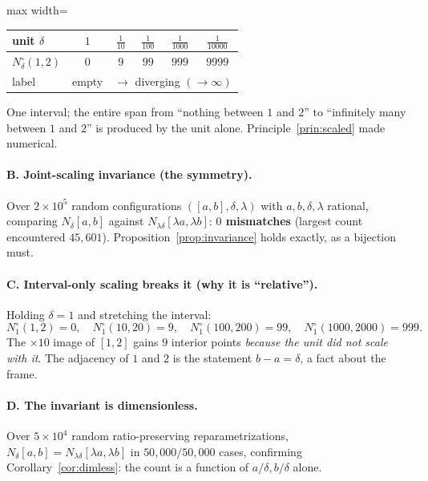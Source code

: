 \documentclass[11pt]{article}
\theoremstyle{definition}
\theoremstyle{plain}
\begin{document}
\begin{center}
\renewcommand{\arraystretch}{1.3}
\begin{adjustbox}{max width=\linewidth}\begin{tabular}{@{}lccccc@{}}
\toprule
unit $\delta$ & $1$ & $\tfrac{1}{10}$ & $\tfrac{1}{100}$ & $\tfrac{1}{1000}$ & $\tfrac{1}{10000}$\\
\midrule
$N_\delta^{\circ}(1,2)$ & $0$ & $9$ & $99$ & $999$ & $9999$\\
label & empty & \multicolumn{4}{c}{$\longrightarrow$ diverging $(\to\infty)$}\\
\bottomrule
\end{tabular}\end{adjustbox}
\end{center}

\noindent One interval; the entire span from ``nothing between $1$ and $2$'' to ``infinitely many
between $1$ and $2$'' is produced by the unit alone. Principle~\ref{prin:scaled} made numerical.

\paragraph{B. Joint-scaling invariance (the symmetry).} Over $2\times10^{5}$ random configurations
$([a,b],\delta,\lambda)$ with $a,b,\delta,\lambda$ rational, comparing $N_\delta[a,b]$ against
$N_{\lambda\delta}[\lambda a,\lambda b]$: \textbf{$0$ mismatches} (largest count encountered $45{,}601$).
Proposition~\ref{prop:invariance} holds exactly, as a bijection must.

\paragraph{C. Interval-only scaling breaks it (why it is ``relative'').} Holding $\delta=1$ and
stretching the interval:
\[
  N_1^{\circ}(1,2)=0,\quad N_1^{\circ}(10,20)=9,\quad N_1^{\circ}(100,200)=99,\quad N_1^{\circ}(1000,2000)=999.
\]
The $\times 10$ image of $[1,2]$ gains $9$ interior points \emph{because the unit did not scale with
it}. The adjacency of $1$ and $2$ is the statement $b-a=\delta$, a fact about the frame.

\paragraph{D. The invariant is dimensionless.} Over $5\times10^{4}$ random ratio-preserving
reparametrizations, $N_\delta[a,b]=N_{\lambda\delta}[\lambda a,\lambda b]$ in \textbf{$50{,}000/50{,}000$}
cases, confirming Corollary~\ref{cor:dimless}: the count is a function of $a/\delta,b/\delta$ alone.
\end{document}

